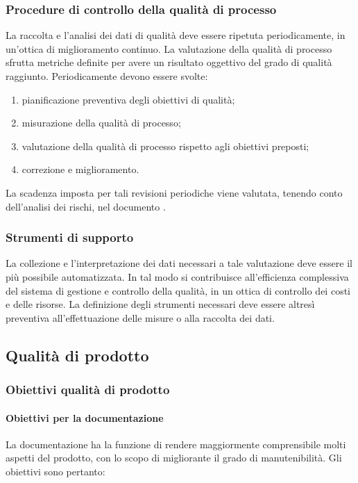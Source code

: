 \documentclass[12pt,a4paper]{article}
\begin{document}
\subsubsection{Procedure di controllo della qualità di processo}
La raccolta e l'analisi dei dati di qualità deve essere ripetuta periodicamente, in un'ottica di miglioramento continuo. La valutazione della qualità di processo sfrutta metriche  definite per avere un risultato oggettivo del grado di qualità raggiunto. Periodicamente devono essere svolte:
\begin{enumerate}
	\item pianificazione preventiva degli obiettivi di qualità;
	\item misurazione della qualità di processo;
	\item valutazione della qualità di processo rispetto agli obiettivi preposti;
	\item correzione e miglioramento.
\end{enumerate}
La scadenza imposta per tali revisioni periodiche viene valutata, tenendo  conto dell'analisi dei rischi, nel documento \PdP{}.

\subsubsection{Strumenti di supporto}
La collezione e l'interpretazione dei dati necessari a tale valutazione deve essere il più possibile automatizzata. In tal modo si contribuisce all'efficienza complessiva del sistema di gestione e controllo della qualità, in un ottica di controllo dei costi e delle risorse. La definizione degli strumenti necessari deve essere altresì preventiva all'effettuazione delle misure o alla raccolta dei dati.

\subsection{Qualità di prodotto}

\subsubsection{Obiettivi qualità di prodotto}

\paragraph{Obiettivi per la documentazione}
La documentazione ha la funzione di rendere maggiormente comprensibile molti aspetti del prodotto, con lo scopo di migliorante il grado di manutenibilità. Gli obiettivi sono pertanto:
\end{document}
